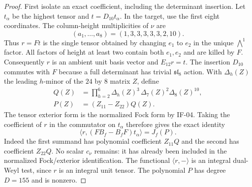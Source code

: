 \begin{proof}
First isolate an exact coefficient, including the determinant
insertion. Let $t_\alpha$ be the highest tensor and
$t=D_{10}t_\alpha$. In the target, use the first eight coordinates.
The column-height multiplicities of $\nu$ are
\[
          (a_1,\ldots,a_8)=(1,3,3,3,3,3,2,10).
\]
Thus $r=Ft$ is the single tensor obtained by changing $e_1$ to
$e_2$ in the unique $\bigwedge^1$ factor. All factors of height
at least two contain both $e_1,e_2$ and are killed by $F$.
Consequently $r$ is an ambient unit basis vector and $E_{12}r=t$.
The insertion $D_{10}$ commutes with $F$ because a full determinant
has trivial $\mathfrak{sl}_8$ action. With $\Delta_h(Z)$ the leading
$h$-minor of the $24$ by $8$ matrix $Z$, define
\[
 \begin{split}
 Q(Z)&=\prod_{h=2}^{6}\Delta_h(Z)^3\,
                         \Delta_7(Z)^2\Delta_8(Z)^{10},\\
 P(Z)&=(Z_{11}-Z_{22})Q(Z).
 \end{split}                                                  \tag{IF-12f}
\]
The tensor exterior form is the normalized Fock form by IF-04.
Taking the coefficient of $r$ in the commutator on $t_\alpha$
therefore gives the exact identity
\[
       \langle r,(F B_f-B_fF)t_\alpha\rangle=J_f(P).            \tag{IF-12g}
\]
Indeed the first summand has polynomial coefficient $Z_{11}Q$ and
the second has coefficient $Z_{22}Q$. No scalar $c_\nu$ remains:
it has already been included in the normalized Fock/exterior
identification. The functional $\langle r,-\rangle$ is an integral
dual-Weyl test, since $r$ is an integral unit tensor. The polynomial
$P$ has degree $D=155$ and is nonzero.


\end{proof}
